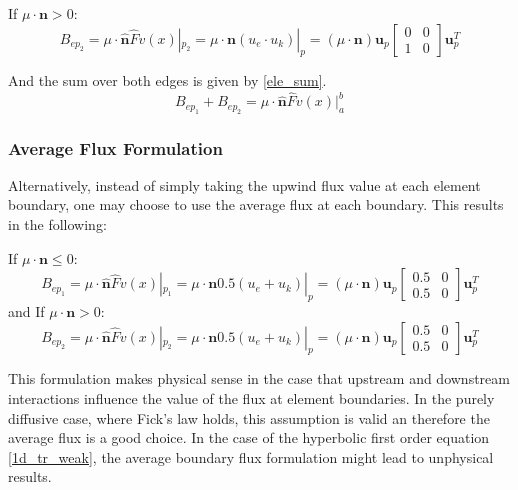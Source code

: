 If $\mu \cdot \mathbf n > 0$:
\begin{equation}
B_{ep_2} = \mu \cdot \hat{\mathbf n} \hat{F}  v(x)|_{p_2} = 
\mu \cdot \mathbf n (u_e \cdot u_k)|_p = 
(\mu \cdot \mathbf n) \mathbf u_p 
\begin{bmatrix}
    0      & 0 \\
    1      & 0 
\end{bmatrix}
\mathbf u_p^T
\end{equation}

And the sum over both edges is given by \ref{ele_sum}.
\begin{equation}
 B_{ep_1} + B_{ep_2} = \mu \cdot \hat{\mathbf n} \hat{F}  v(x)|_a^b
\label{ele_sum}
\end{equation}

\subsubsection{Average Flux Formulation}
Alternatively, instead of simply taking the upwind flux value at each element boundary, one may choose to use the average flux at each boundary.  This results in the following:

If $\mu \cdot \mathbf n \leq 0$: 
\begin{equation}
B_{ep_1} = \mu \cdot \hat{\mathbf n} \hat{F}  v(x)|_{p_1} = 
\mu \cdot \mathbf n 0.5 (u_e + u_k)|_p = 
(\mu \cdot \mathbf n) \mathbf u_p 
\begin{bmatrix}
    0.5     & 0 \\
    0.5     & 0 
\end{bmatrix}
\mathbf u_p^T
\end{equation}
and
If $\mu \cdot \mathbf n > 0$:
\begin{equation}
B_{ep_2} = \mu \cdot \hat{\mathbf n} \hat{F}  v(x)|_{p_2} = 
\mu \cdot \mathbf n 0.5 (u_e + u_k)|_p = 
(\mu \cdot \mathbf n) \mathbf u_p 
\begin{bmatrix}
    0.5     & 0 \\
    0.5     & 0 
\end{bmatrix}
\mathbf u_p^T
\end{equation}

This formulation makes physical sense in the case that upstream and downstream interactions influence the value of the flux at element boundaries.  In the purely diffusive case, where Fick's law holds, this assumption is valid an therefore the average flux is a good choice.  In the case of the hyperbolic first order equation \ref{1d_tr_weak}, the average boundary flux formulation might lead to unphysical results.

